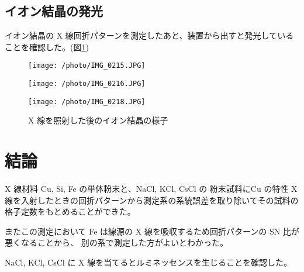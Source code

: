 \documentclass[11pt,dvipdfmx,a4paper]{jsarticle}
\begin{document}
\subsection{イオン結晶の発光}
イオン結晶の X 線回折パターンを測定したあと、装置から出すと発光していることを確認した。(図\ref{photo:ion})
\begin{figure}[h]
	\begin{minipage}[t]{0.3\columnwidth}
		\centering
		\texttt{[image: /photo/IMG\_0215.JPG]}
	\end{minipage}
	\hfill
	\begin{minipage}[t]{0.3\columnwidth}
		\centering
		\texttt{[image: /photo/IMG\_0216.JPG]}
	\end{minipage}
	\hfill
	\begin{minipage}[t]{0.3\columnwidth}
		\centering
		\texttt{[image: /photo/IMG\_0218.JPG]}
	\end{minipage}
	\caption{X 線を照射した後のイオン結晶の様子}
	\label{photo:ion}
\end{figure}


\section{結論}
X 線材料 Cu, Si, Fe の単体粉末と、NaCl, KCl, CsCl の
粉末試料にCu の特性 X 線を入射したときの回折パターンから測定系の系統誤差を取り除いてその試料の格子定数をもとめることができた。

またこの測定において Fe は線源の X 線を吸収するため回折パターンの SN 比が悪くなることから、
別の系で測定した方がよいとわかった。

NaCl, KCl, CsCl に X 線を当てるとルミネッセンスを生じることを確認した。



\end{document}
